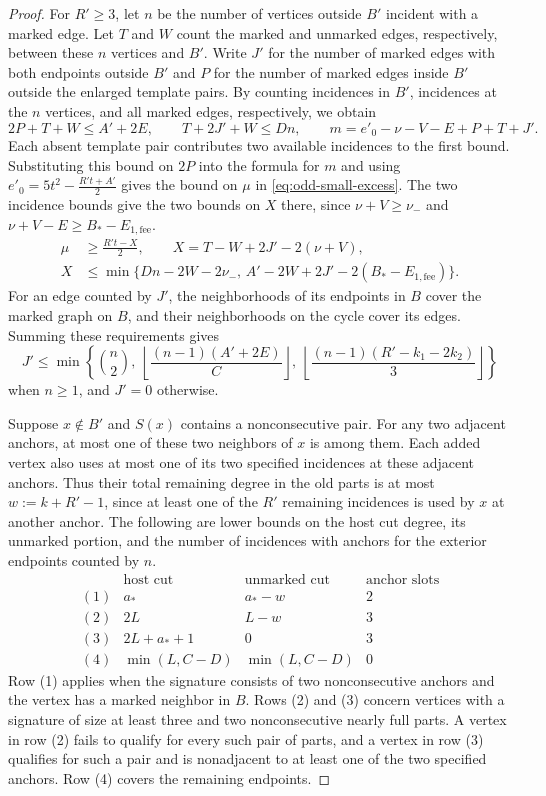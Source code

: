 \documentclass[preprint,11pt,numbers]{elsarticle-arxiv}
\numberwithin{equation}{section}
\theoremstyle{definition}
\begin{document}
\begin{proof}
For $R'\geq3$, let $n$ be the number of vertices outside $B'$ incident
with a marked edge. Let $T$ and $W$ count the marked and unmarked
edges, respectively, between these $n$ vertices and $B'$. Write $J'$
for the number of marked edges with both endpoints outside $B'$ and
$P$ for the number of marked edges inside $B'$ outside the enlarged
template pairs. By counting incidences in $B'$, incidences at the $n$
vertices, and all marked edges, respectively, we obtain
\[
 2P+T+W\leq A'+2E,\qquad T+2J'+W\leq Dn,\qquad
 m=e'_0-\nu-V-E+P+T+J'.
\]
Each absent template pair contributes two available incidences to
the first bound. Substituting this bound on $2P$ into the formula
for $m$ and using $e'_0=5t^2-\frac{R't+A'}{2}$ gives the bound on
$\mu$ in \eqref{eq:odd-small-excess}. The two incidence bounds give
the two bounds on $X$ there, since $\nu+V\geq \nu_-$ and
$\nu+V-E\geq B_*-E_{1,\mathrm{fee}}$.
\begin{equation}\label{eq:odd-small-excess}
 \begin{split}
 \mu&\geq \frac{R't-X}{2},\qquad X=T-W+2J'-2(\nu+V),\\
 X&\leq \min\{Dn-2W-2\nu_-,\,
          A'-2W+2J'-2(B_*-E_{1,\mathrm{fee}})\}.
 \end{split}
\end{equation}
For an edge counted by $J'$, the neighborhoods of its endpoints
in $B$ cover the marked graph on $B$, and their neighborhoods on
the cycle cover its edges. Summing these requirements gives
\[
 J'\leq \min\left\{\binom{n}{2},\ 
      \left\lfloor\frac{(n-1)(A'+2E)}{C}\right\rfloor,\ 
      \left\lfloor\frac{(n-1)(R'-k_1-2k_2)}{3}\right\rfloor\right\}
\]
when $n\geq1$, and $J'=0$ otherwise.

Suppose $x\notin B'$ and $S(x)$ contains a nonconsecutive pair.
For any two adjacent anchors, at most one of these two neighbors
of $x$ is among them. Each added vertex also uses at most one
of its two specified incidences at these adjacent anchors.
Thus their total remaining degree in the old parts is at most
$w:=k+R'-1$, since at least one of the $R'$ remaining incidences
is used by $x$ at another anchor. The following are lower bounds on
the host cut degree, its unmarked portion, and the number of
incidences with anchors for the exterior endpoints counted by $n$.
\[
\begin{array}{c|ccc}
 &\text{host cut}&\text{unmarked cut}&\text{anchor slots}\\ \hline
 (1)&a_*&a_*-w&2\\
 (2)&2L&L-w&3\\
 (3)&2L+a_*+1&0&3\\
 (4)&\min(L,C-D)&\min(L,C-D)&0
\end{array}
\]
Row (1) applies when the signature consists of two nonconsecutive
anchors and the vertex has a marked neighbor in $B$. Rows (2) and
(3) concern vertices with a signature of size at least three and
two nonconsecutive nearly full parts. A vertex in row (2) fails
to qualify for every such pair of parts, and a vertex in row (3)
qualifies for such a pair and is nonadjacent to at least one of
the two specified anchors. Row (4) covers the remaining endpoints.


\end{proof}
\end{document}
